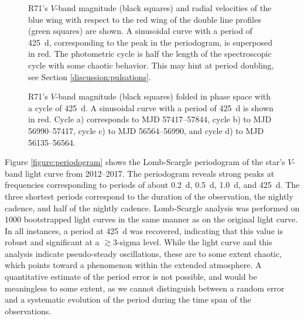\documentclass[structabstract]{aa}
\begin{document}
 \begin{figure}
\centering
{}
     \caption{R71's $V$-band magnitude (black squares) and radial velocities of the blue wing with respect to the red wing of the double line profiles (green squares) are shown. A sinusoidal curve with a period of 425~d, corresponding to the peak in the periodogram, is superposed in red. The photometric cycle is half the length of the spectroscopic cycle with some chaotic behavior. This may hint at period doubling, see Section \ref{discussion:pulsations}.}
     \label{figure:overview_time}
\end{figure}



 \begin{figure}
\centering
{}
     \caption{R71's $V$-band magnitude (black squares) folded in phase space with a cycle of 425~d. A sinusoidal curve with a period of 425~d is shown in red. Cycle a) corresponds to MJD 57417--57844, cycle b) to MJD 56990--57417, cycle c) to MJD 56564--56990, and cycle d) to MJD 56135--56564.}
     \label{figure:overview_cycle}
\end{figure}


Figure \ref{figure:periodogram} shows the Lomb-Scargle periodogram of the star's $V$-band light curve from 2012--2017. The periodogram reveals strong peaks at frequencies corresponding to periods of about 0.2~d, 0.5~d, 1.0~d, and 425~d. The three shortest periods correspond to the duration of the observation, the nightly cadence, and half of the nightly cadence. Lomb-Scargle analysis was performed on 1000 bootstrapped light curves in the same manner as on the original light curve. In all instances, a period at 425~d was recovered, indicating that this value is robust and significant at a $\gtrsim$3-sigma level. 
While the light curve and this analysis indicate pseudo-steady oscillations, these are to some extent chaotic, which points toward a phenomenon within the extended atmosphere.
A quantitative estimate of the period error is not possible, and would be meaningless to some extent, as we cannot distinguish between a random error and a systematic evolution of the period during the time span of the observations.
 
\end{document}
